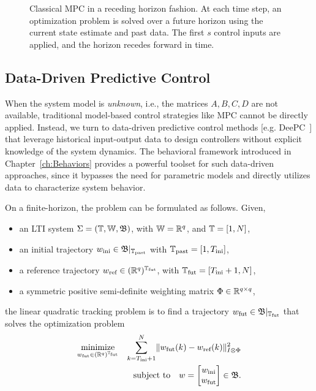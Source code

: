 \begin{figure}[h!]
    \caption{Classical MPC in a receding horizon fashion. At each time step, an optimization problem is solved over a future horizon using the current state estimate and past data. The first $s$ control inputs are applied, and the horizon recedes forward in time.}
        \label{fig:mpc_schematic}
\end{figure}

\newpage
\subsection{Data-Driven Predictive Control}

When the system model is \emph{unknown}, i.e., the matrices $A, B, C, D$ are not available, traditional model-based control strategies like MPC cannot be directly applied. Instead, we turn to data-driven predictive control methods [e.g. DeePC~\cite{jeremy2019}] that leverage historical input-output data to design controllers without explicit knowledge of the system dynamics. The behavioral framework introduced in Chapter~\ref{ch:Behaviors} provides a powerful toolset for such data-driven approaches, since it bypasses the need for parametric models and directly utilizes data to characterize system behavior.

On a finite-horizon, the problem can be formulated as follows. Given,
\begin{itemize}
    \item an LTI system $\Sigma = (\mathbb{T}, \mathbb{W}, \mathfrak{B})$, with $\mathbb{W} = \mathbb{R}^q$, and $\mathbb{T} = [1,N]$,
    \item an initial trajectory $w_{\textrm{ini}} \in \mathfrak{B} |_{\mathbb{T}_{\textrm{past}}}$ with $\mathbb{T}_{\textrm{past}} = [1, T_{\textrm{ini}}]$,
    \item a reference trajectory $w_{\textrm{ref}} \in (\mathbb{R}^q)^{\mathbb{T}_{\textrm{fut}}}$, with $\mathbb{T}_{\textrm{fut}} = [T_{\textrm{ini}}+1, N]$,
    \item a symmetric positive semi-definite weighting matrix $\Phi \in \mathbb{R}^{q \times q}$,
\end{itemize}
the linear quadratic tracking problem is to find a trajectory $w_{\textrm{fut}} \in \mathfrak{B} |_{\mathbb{T}_{\textrm{fut}}}$ that solves the optimization problem
\begin{equation}\label{eq:lqt_behavioral}
    \begin{aligned}
        \underset{w_{\textrm{fut}} \in (\mathbb{R}^q)^{\mathbb{T}_{\textrm{fut}}}}{\text{minimize}} && \sum_{k=T_{\textrm{ini}}+1}^{N} \lVert w_{\textrm{fut}}(k) - w_{\textrm{ref}}(k) \rVert_{I \otimes \Phi}^2 \\
       && \text{subject to} \quad w = \begin{bmatrix} w_{\textrm{ini}} \\ w_{\textrm{fut}} \end{bmatrix} \in \mathfrak{B}.
    \end{aligned}
\end{equation}

